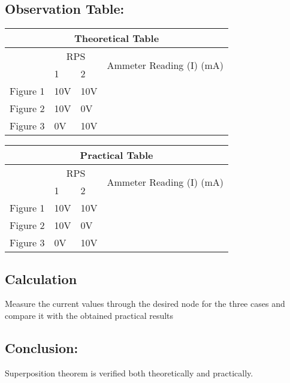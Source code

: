\subsection*{Observation Table:}

\begin{table}[h]
    \centering
    \begin{tabular}{m{2cm}|m{1.5cm}|m{1.5cm}|m{5cm}}
        \multicolumn{4}{c}{\textbf{Theoretical Table}} \\
        \hline
        & \multicolumn{2}{c|}{RPS} & \multirow{2}{*}{Ammeter Reading (I) (mA)} \\
        \cline{2-3}
        & 1 & 2 & \\
        \hline
        Figure 1 & 10V & 10V & \\
        \hline
        Figure 2 & 10V & 0V & \\
        \hline
        Figure 3 & 0V & 10V & \\
        \hline
    \end{tabular}
\end{table}

\begin{table}[h]
    \centering
    \begin{tabular}{m{2cm}|m{1.5cm}|m{1.5cm}|m{5cm}}
        
        \multicolumn{4}{c}{\textbf{Practical Table}} \\
        \hline
        & \multicolumn{2}{c|}{RPS} & \multirow{2}{*}{Ammeter Reading (I) (mA)} \\
        \cline{2-3}
        & 1 & 2 & \\
        \hline
        Figure 1 & 10V & 10V & \\
        \hline
        Figure 2 & 10V & 0V & \\
        \hline
        Figure 3 & 0V & 10V & \\
        \hline
    \end{tabular}
\end{table}


\subsection*{Calculation}
Measure the current values through the desired node for the three cases and compare it with the obtained practical results

\subsection*{Conclusion:}
Superposition theorem is verified both theoretically and practically.

\newpage